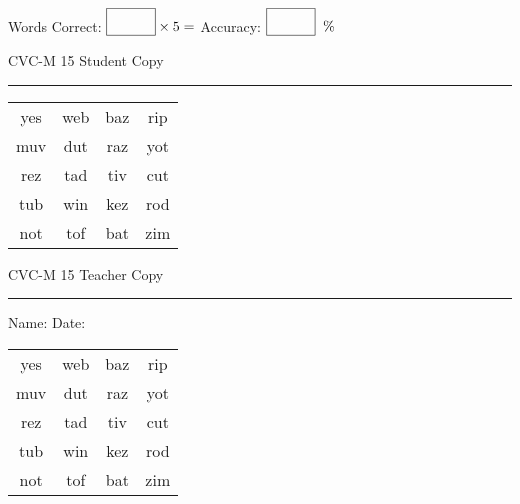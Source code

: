 \documentclass{memoir}
\begin{document}
\small

Words Correct: $\fbox{\phantom{\huge 100}} \times 5 = $ Accuracy: $\fbox{\phantom{\huge 100}}\;\; \%$ 

\vfill

\newpage


\footnotesize \noindent
CVC-M 15 \hfill Student Copy
\smallskip
\hrule

\Large

\setlength{\tabcolsep}{14pt}
\def\arraystretch{2}

{\selectfont


\begin{vplace}[0.5]
\begin{center}
\begin{tabular}{cccc}
yes & web & baz & rip \\
muv & dut & raz & yot \\
rez & tad & tiv & cut \\
tub & win & kez & rod \\
not & tof & bat & zim \\
\end{tabular}
\end{center}
\end{vplace}

}

\newpage

\footnotesize \noindent
CVC-M 15 \hfill Teacher Copy
\smallskip
\hrule

\small

\vfill

\noindent
Name: \underline{\hspace{1.75in}} \hfill Date: \underline{\hspace{1in}}

\Large

{\selectfont


\begin{vplace}[0.5]
\begin{center}
\begin{tabular}{cccc}
yes & web & baz & rip \\
muv & dut & raz & yot \\
rez & tad & tiv & cut \\
tub & win & kez & rod \\
not & tof & bat & zim \\
\end{tabular}
\end{center}
\end{vplace}



}
\end{document}
